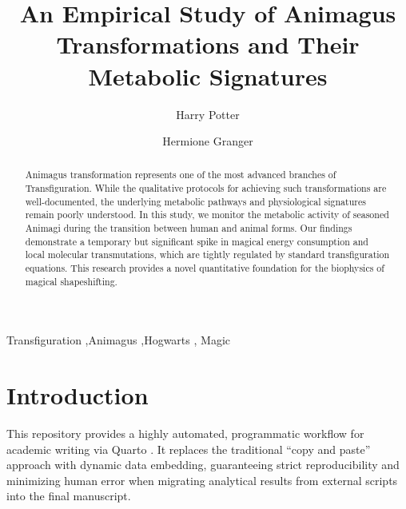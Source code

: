 \documentclass[
  authoryear,
  preprint,
  3p]{elsarticle}
\begin{document}
\begin{frontmatter}
\title{An Empirical Study of Animagus Transformations and Their Metabolic Signatures}
\author[1,2]{Harry Potter%
%
}
\author[2]{Hermione Granger%
%
}




        
\begin{abstract}
Animagus transformation represents one of the most advanced branches of Transfiguration. While the qualitative protocols for achieving such transformations are well-documented, the underlying metabolic pathways and physiological signatures remain poorly understood. In this study, we monitor the metabolic activity of seasoned Animagi during the transition between human and animal forms. Our findings demonstrate a temporary but significant spike in magical energy consumption and local molecular transmutations, which are tightly regulated by standard transfiguration equations. This research provides a novel quantitative foundation for the biophysics of magical shapeshifting.
\end{abstract}





\begin{keyword}
    Transfiguration \sep Animagus \sep Hogwarts \sep 
    Magic
\end{keyword}
\end{frontmatter}
    

\section{Introduction}\label{introduction}

This repository provides a highly automated, programmatic workflow for academic writing via Quarto \citep{smith2023}.
It replaces the traditional ``copy and paste'' approach with dynamic data embedding, guaranteeing strict reproducibility and minimizing human error when migrating analytical results from external scripts into the final manuscript.
\end{document}
